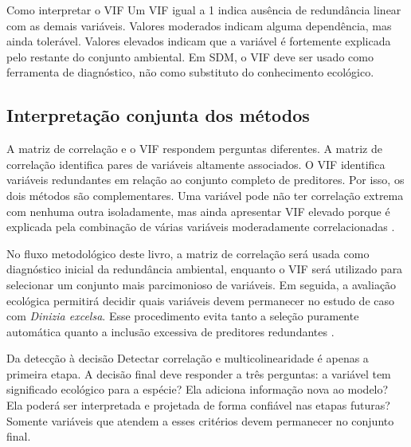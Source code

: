 \begin{caixaconceitual}{Como interpretar o VIF}
	Um VIF igual a 1 indica ausência de redundância linear com as demais variáveis. Valores moderados indicam alguma dependência, mas ainda tolerável. Valores elevados indicam que a variável é fortemente explicada pelo restante do conjunto ambiental. Em SDM, o VIF deve ser usado como ferramenta de diagnóstico, não como substituto do conhecimento ecológico.
\end{caixaconceitual}

\subsection{Interpretação conjunta dos métodos}

A matriz de correlação e o VIF respondem perguntas diferentes. A matriz de correlação identifica pares de variáveis altamente associados. O VIF identifica variáveis redundantes em relação ao conjunto completo de preditores. Por isso, os dois métodos são complementares. Uma variável pode não ter correlação extrema com nenhuma outra isoladamente, mas ainda apresentar VIF elevado porque é explicada pela combinação de várias variáveis moderadamente correlacionadas \parencite{dormann2013collinearity}.

No fluxo metodológico deste livro, a matriz de correlação será usada como diagnóstico inicial da redundância ambiental, enquanto o VIF será utilizado para selecionar um conjunto mais parcimonioso de variáveis. Em seguida, a avaliação ecológica permitirá decidir quais variáveis devem permanecer no estudo de caso com \textit{Dinizia excelsa}. Esse procedimento evita tanto a seleção puramente automática quanto a inclusão excessiva de preditores redundantes \parencite{franklin2010mapping,guisan2017habitat}.

\begin{caixaaplicacao}{Da detecção à decisão}
	Detectar correlação e multicolinearidade é apenas a primeira etapa. A decisão final deve responder a três perguntas: a variável tem significado ecológico para a espécie? Ela adiciona informação nova ao modelo? Ela poderá ser interpretada e projetada de forma confiável nas etapas futuras? Somente variáveis que atendem a esses critérios devem permanecer no conjunto final.
\end{caixaaplicacao}


